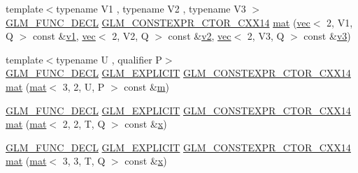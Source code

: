 \begin{DoxyCompactItemize}
\item 
{\footnotesize template$<$typename V1 , typename V2 , typename V3 $>$ }\\\mbox{\hyperlink{setup_8hpp_ab2d052de21a70539923e9bcbf6e83a51}{G\+L\+M\+\_\+\+F\+U\+N\+C\+\_\+\+D\+E\+CL}} \mbox{\hyperlink{setup_8hpp_a0900f9145e68bf6061b6f5e7be3fa751}{G\+L\+M\+\_\+\+C\+O\+N\+S\+T\+E\+X\+P\+R\+\_\+\+C\+T\+O\+R\+\_\+\+C\+X\+X14}} \mbox{\hyperlink{structglm_1_1mat_3_013_00_012_00_01_t_00_01_q_01_4_a05957fdeea53e736c395bc5c818f87cd}{mat}} (\mbox{\hyperlink{structglm_1_1vec}{vec}}$<$ 2, V1, Q $>$ const \&\mbox{\hyperlink{_s_d_l__opengl__glext_8h_a435c176a02c061b43e19bdf7c86cceae}{v1}}, \mbox{\hyperlink{structglm_1_1vec}{vec}}$<$ 2, V2, Q $>$ const \&\mbox{\hyperlink{_s_d_l__opengl__glext_8h_a0928f6d0f0f794ba000a21dfae422136}{v2}}, \mbox{\hyperlink{structglm_1_1vec}{vec}}$<$ 2, V3, Q $>$ const \&\mbox{\hyperlink{_s_d_l__opengl__glext_8h_acc806b31cbf466ceba6555983d8b814d}{v3}})
\item 
{\footnotesize template$<$typename U , qualifier P$>$ }\\\mbox{\hyperlink{setup_8hpp_ab2d052de21a70539923e9bcbf6e83a51}{G\+L\+M\+\_\+\+F\+U\+N\+C\+\_\+\+D\+E\+CL}} \mbox{\hyperlink{setup_8hpp_a6c74f5a5e7b134ab69023ff9a30d4d5d}{G\+L\+M\+\_\+\+E\+X\+P\+L\+I\+C\+IT}} \mbox{\hyperlink{setup_8hpp_a0900f9145e68bf6061b6f5e7be3fa751}{G\+L\+M\+\_\+\+C\+O\+N\+S\+T\+E\+X\+P\+R\+\_\+\+C\+T\+O\+R\+\_\+\+C\+X\+X14}} \mbox{\hyperlink{structglm_1_1mat_3_013_00_012_00_01_t_00_01_q_01_4_ad6c2490865785641ce19a850997227ff}{mat}} (\mbox{\hyperlink{structglm_1_1mat}{mat}}$<$ 3, 2, U, P $>$ const \&\mbox{\hyperlink{_s_d_l__opengl__glext_8h_af593500c283bf1a787a6f947f503a5c2}{m}})
\item 
\mbox{\hyperlink{setup_8hpp_ab2d052de21a70539923e9bcbf6e83a51}{G\+L\+M\+\_\+\+F\+U\+N\+C\+\_\+\+D\+E\+CL}} \mbox{\hyperlink{setup_8hpp_a6c74f5a5e7b134ab69023ff9a30d4d5d}{G\+L\+M\+\_\+\+E\+X\+P\+L\+I\+C\+IT}} \mbox{\hyperlink{setup_8hpp_a0900f9145e68bf6061b6f5e7be3fa751}{G\+L\+M\+\_\+\+C\+O\+N\+S\+T\+E\+X\+P\+R\+\_\+\+C\+T\+O\+R\+\_\+\+C\+X\+X14}} \mbox{\hyperlink{structglm_1_1mat_3_013_00_012_00_01_t_00_01_q_01_4_a25c9c73a24a4e8f13ba8694642a43387}{mat}} (\mbox{\hyperlink{structglm_1_1mat}{mat}}$<$ 2, 2, T, Q $>$ const \&\mbox{\hyperlink{_s_d_l__opengl_8h_ad0e63d0edcdbd3d79554076bf309fd47}{x}})
\item 
\mbox{\hyperlink{setup_8hpp_ab2d052de21a70539923e9bcbf6e83a51}{G\+L\+M\+\_\+\+F\+U\+N\+C\+\_\+\+D\+E\+CL}} \mbox{\hyperlink{setup_8hpp_a6c74f5a5e7b134ab69023ff9a30d4d5d}{G\+L\+M\+\_\+\+E\+X\+P\+L\+I\+C\+IT}} \mbox{\hyperlink{setup_8hpp_a0900f9145e68bf6061b6f5e7be3fa751}{G\+L\+M\+\_\+\+C\+O\+N\+S\+T\+E\+X\+P\+R\+\_\+\+C\+T\+O\+R\+\_\+\+C\+X\+X14}} \mbox{\hyperlink{structglm_1_1mat_3_013_00_012_00_01_t_00_01_q_01_4_a0a820cd88c9add37c061f4b49ebf9570}{mat}} (\mbox{\hyperlink{structglm_1_1mat}{mat}}$<$ 3, 3, T, Q $>$ const \&\mbox{\hyperlink{_s_d_l__opengl_8h_ad0e63d0edcdbd3d79554076bf309fd47}{x}})

\end{DoxyCompactItemize}
